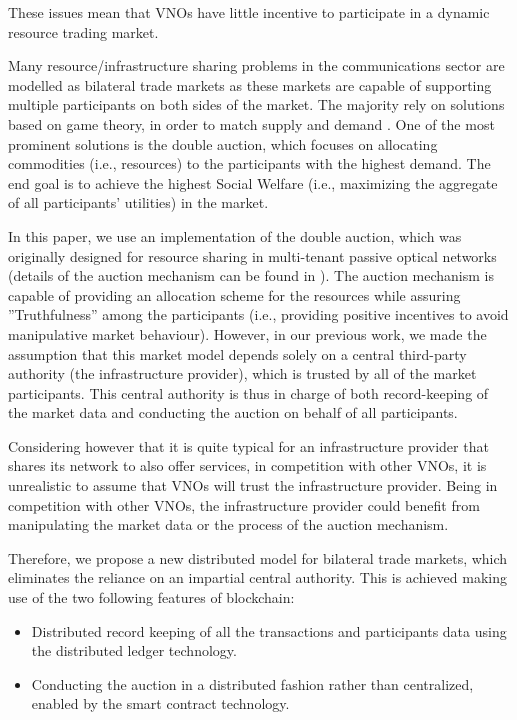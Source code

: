 \documentclass[conference]{IEEEtran}
\begin{document}
These issues mean that VNOs have little incentive to participate in a dynamic resource trading market.


Many resource/infrastructure sharing problems in the communications sector are modelled as bilateral trade markets as these markets are capable of supporting multiple participants on both sides of the market. The majority rely on solutions based on game theory, in order to match supply and demand \cite{8542782,8665886,8664672,8395445,8488596}. One of the most prominent solutions is the double auction, which focuses on allocating commodities (i.e., resources) to the participants with the highest demand. The end goal is to achieve the highest Social Welfare (i.e., maximizing the aggregate of all participants' utilities) in the market. 

In this paper, we use an implementation of the double auction, which was originally designed for resource sharing in multi-tenant passive optical networks (details of the auction mechanism can be found in \cite{8488596}). The auction mechanism is capable of providing an allocation scheme for the resources while assuring ''Truthfulness'' among the participants (i.e., providing positive incentives to avoid manipulative market behaviour). However, in our previous work, we made the assumption that this market model depends solely on a central third-party authority (the infrastructure provider), which is trusted by all of the market participants. This central authority is thus in charge of both record-keeping of the market data and conducting the auction on behalf of all participants. 

Considering however that it is quite typical for an infrastructure provider that shares its network to also offer services, in competition with other VNOs, it is unrealistic to assume that VNOs will trust the infrastructure provider. Being in competition with other VNOs, the infrastructure provider could benefit from manipulating the market data or the process of the auction mechanism. 

Therefore, we propose a new distributed model for bilateral trade markets, which eliminates the reliance on an impartial central authority. This is achieved making use of the two following features of blockchain:

\begin{itemize}
    \item Distributed record keeping of all the transactions and participants data using the distributed ledger technology.
    \item Conducting the auction in a distributed fashion rather than centralized, enabled by the smart contract technology.
\end{itemize}
\end{document}
